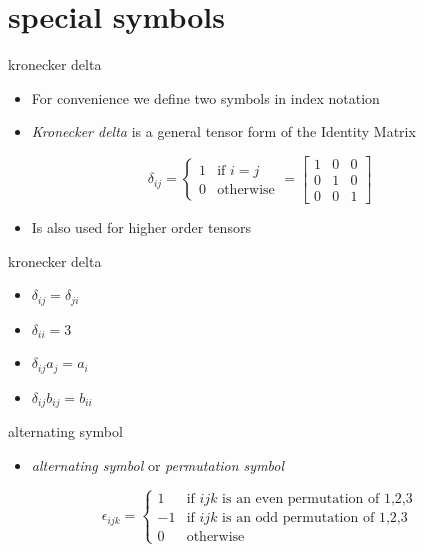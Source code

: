 \documentclass[
  letterpaper,
  ignorenonframetext,
  aspectratio=43,
  handout,
  12pt]{beamer}
\providecommand{\tightlist}{%
  \setlength{\itemsep}{0pt}\setlength{\parskip}{0pt}}
\providecommand{\tightlist}{%
\setlength{\itemsep}{0pt}\setlength{\parskip}{0pt}}
\begin{document}
\hypertarget{special-symbols}{%
\section{special symbols}\label{special-symbols}}

\begin{frame}{kronecker delta}
\protect\hypertarget{kronecker-delta}{}
\begin{itemize}
\tightlist
\item
  For convenience we define two symbols in index notation
\item
  \emph{Kronecker delta} is a general tensor form of the Identity Matrix
\end{itemize}

\[\delta_{ij} = \left\{
\begin{array}{ll}
  1& \text{if $i=j$}\\
  0& \text{otherwise}
\end{array}
\right. = \begin{bmatrix}
  1 & 0 & 0\\
  0 & 1 & 0 \\
  0 & 0 & 1
\end{bmatrix}\]

\begin{itemize}
\tightlist
\item
  Is also used for higher order tensors
\end{itemize}
\end{frame}

\begin{frame}{kronecker delta}
\protect\hypertarget{kronecker-delta-1}{}
\begin{itemize}
\tightlist
\item
  \(\delta_{ij} = \delta_{ji}\)
\item
  \(\delta_{ii} = 3\)
\item
  \(\delta_{ij} a_j = a_{i}\)
\item
  \(\delta _{ij} b_{ij} = b_{ii}\)
\end{itemize}
\end{frame}

\begin{frame}{alternating symbol}
\protect\hypertarget{alternating-symbol}{}
\begin{itemize}
\tightlist
\item
  \emph{alternating symbol} or \emph{permutation symbol}
\end{itemize}

\[\epsilon_{ijk} = \left\{
\begin{array}{rl}
  1 & \text{if $ijk$ is an even permutation of 1,2,3}\\
  -1 & \text{if $ijk$ is an odd permutation of 1,2,3}\\
  0 & \text{otherwise}
\end{array}
\right.\]
\end{frame}
\end{document}
